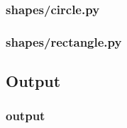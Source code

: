 \documentclass{beamer}
\begin{document}
  \begin{frame}
    \frametitle{shapes/circle.py}
    
  \end{frame}

  \begin{frame}
    \frametitle{shapes/rectangle.py}
    
  \end{frame}

\subsection{Output}
  \begin{frame}
    \frametitle{output}
    
  \end{frame}
\end{document}
